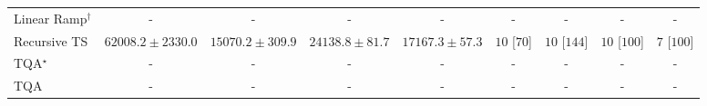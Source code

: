 \begin{tabular}{l|cccc|cccc|}
Linear Ramp$^\dagger$ & {\cellcolor[HTML]{000000}} \color[HTML]{F1F1F1} {\cellcolor{white}} \color{black} - & {\cellcolor[HTML]{000000}} \color[HTML]{F1F1F1} {\cellcolor{white}} \color{black} - & {\cellcolor[HTML]{000000}} \color[HTML]{F1F1F1} {\cellcolor{white}} \color{black} - & {\cellcolor[HTML]{000000}} \color[HTML]{F1F1F1} {\cellcolor{white}} \color{black} - & {\cellcolor[HTML]{000000}} \color[HTML]{F1F1F1} {\cellcolor{white}} \color{black} - & {\cellcolor[HTML]{000000}} \color[HTML]{F1F1F1} {\cellcolor{white}} \color{black} - & {\cellcolor[HTML]{000000}} \color[HTML]{F1F1F1} {\cellcolor{white}} \color{black} - & {\cellcolor[HTML]{000000}} \color[HTML]{F1F1F1} {\cellcolor{white}} \color{black} - \\
Recursive TS & {\cellcolor[HTML]{831A83}} \color[HTML]{F1F1F1} $62008.2\pm 2330.0$ & {\cellcolor[HTML]{F1F7FA}} \color[HTML]{000000} $15070.2\pm 309.9$ & {\cellcolor[HTML]{CEDFEC}} \color[HTML]{000000} $24138.8\pm 81.7$ & {\cellcolor[HTML]{EAF3F8}} \color[HTML]{000000} $17167.3\pm 57.3$ & {\cellcolor[HTML]{49006A}} \color[HTML]{F1F1F1} $10$ [$70$] & {\cellcolor[HTML]{49006A}} \color[HTML]{F1F1F1} $10$ [$144$] & {\cellcolor[HTML]{49006A}} \color[HTML]{F1F1F1} $10$ [$100$] & {\cellcolor[HTML]{CD238F}} \color[HTML]{F1F1F1} $7$ [$100$] \\
TQA$^\star$ & {\cellcolor[HTML]{000000}} \color[HTML]{F1F1F1} {\cellcolor{white}} \color{black} - & {\cellcolor[HTML]{000000}} \color[HTML]{F1F1F1} {\cellcolor{white}} \color{black} - & {\cellcolor[HTML]{000000}} \color[HTML]{F1F1F1} {\cellcolor{white}} \color{black} - & {\cellcolor[HTML]{000000}} \color[HTML]{F1F1F1} {\cellcolor{white}} \color{black} - & {\cellcolor[HTML]{000000}} \color[HTML]{F1F1F1} {\cellcolor{white}} \color{black} - & {\cellcolor[HTML]{000000}} \color[HTML]{F1F1F1} {\cellcolor{white}} \color{black} - & {\cellcolor[HTML]{000000}} \color[HTML]{F1F1F1} {\cellcolor{white}} \color{black} - & {\cellcolor[HTML]{000000}} \color[HTML]{F1F1F1} {\cellcolor{white}} \color{black} - \\
TQA & {\cellcolor[HTML]{000000}} \color[HTML]{F1F1F1} {\cellcolor{white}} \color{black} - & {\cellcolor[HTML]{000000}} \color[HTML]{F1F1F1} {\cellcolor{white}} \color{black} - & {\cellcolor[HTML]{000000}} \color[HTML]{F1F1F1} {\cellcolor{white}} \color{black} - & {\cellcolor[HTML]{000000}} \color[HTML]{F1F1F1} {\cellcolor{white}} \color{black} - & {\cellcolor[HTML]{000000}} \color[HTML]{F1F1F1} {\cellcolor{white}} \color{black} - & {\cellcolor[HTML]{000000}} \color[HTML]{F1F1F1} {\cellcolor{white}} \color{black} - & {\cellcolor[HTML]{000000}} \color[HTML]{F1F1F1} {\cellcolor{white}} \color{black} - & {\cellcolor[HTML]{000000}} \color[HTML]{F1F1F1} {\cellcolor{white}} \color{black} - \\

\end{tabular}

